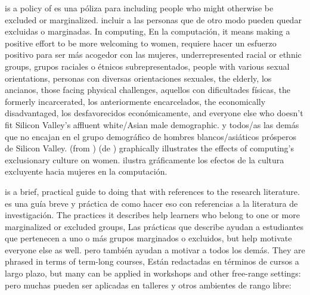 
 is a policy of
 es una póliza para
including people who might otherwise be excluded or marginalized.
incluir a las personas que de otro modo pueden quedar excluidas o marginadas.
In computing,
En la computación,
it means making a positive effort to be more welcoming to women,
requiere hacer un esfuerzo positivo para ser más acogedor con las mujeres,
underrepresented racial or ethnic groups,
grupos raciales o étnicos subrepresentados,
people with various sexual orientations,
personas con diversas orientaciones sexuales,
the elderly,
los ancianos,
those facing physical challenges,
aquellos con dificultades físicas,
the formerly incarcerated,
los anteriormente encarcelados,
the economically disadvantaged,
los desfavorecidos económicamente,
and everyone else who doesn't fit Silicon Valley's affluent white/Asian male demographic.
y todos/as las demás que no encajan en el grupo demográfico de hombres blancos/asiáticos prósperos de Silicon Valley.
 (from )
 (de )
graphically illustrates the effects of computing's exclusionary culture on women.
ilustra gráficamente los efectos de la cultura excluyente hacia mujeres en la computación.

\cite{Lee2017} is a brief, practical guide to doing that with references to the research literature.
\cite{Lee2017} es una guía breve y práctica de como hacer eso con referencias a la literatura de investigación.
The practices it describes help learners who belong to one or more marginalized or excluded groups,
Las prácticas que describe ayudan a estudiantes que pertenecen a uno o más grupos marginados o excluidos,
but help motivate everyone else as well.
pero también ayudan a motivar a todos los demás.
They are phrased in terms of term-long courses,
Están redactadas en términos de cursos a largo plazo,
but many can be applied in workshops and other free-range settings:
pero muchas pueden ser aplicadas en talleres y otros ambientes de rango libre:

